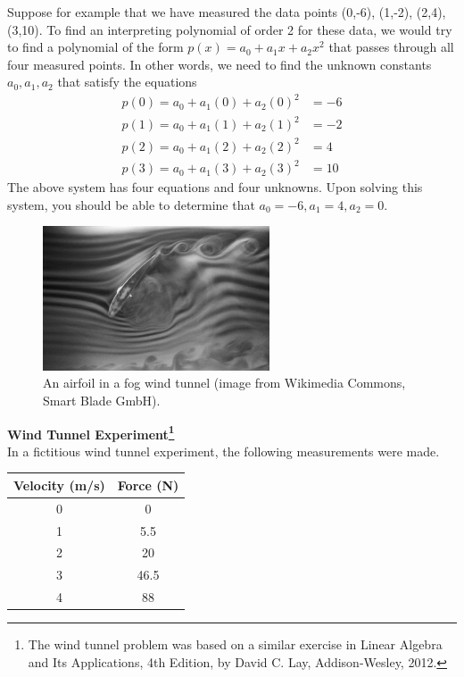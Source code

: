 Suppose for example that we have measured the data points (0,-6), (1,-2), (2,4), (3,10). To find an interpreting polynomial of order 2 for these data, we would try to find a polynomial of the form $p(x) = a_0+a_1x+a_2x^2$ that passes through all four measured points. In other words, we need to find the unknown constants $a_0, a_1, a_2$ that satisfy the equations
\begin{align*}
p(0) = a_0+a_1(0)+a_2(0)^2 &= -6 \\
p(1) = a_0+a_1(1)+a_2(1)^2 &= -2 \\
p(2) = a_0+a_1(2)+a_2(2)^2 &= 4  \\
p(3) = a_0+a_1(3)+a_2(3)^2 &= 10 
\end{align*}
The above system has four equations and four unknowns. Upon solving this system, you should be able to determine that $a_0 = -6, a_1 = 4, a_2=0$.\\

\begin{figure}[H]
  \vspace{-5pt}
  \begin{center}
    \includegraphics[width=0.6\textwidth]{ImgWindTunnel.jpg}
  \end{center}
  \vspace{-20pt}
  \caption{\small{An airfoil in a fog wind tunnel (image from Wikimedia Commons, Smart Blade GmbH).}}
\end{figure}

\textbf{Wind Tunnel Experiment\footnote{The wind tunnel problem was based on a similar exercise in Linear Algebra and Its Applications, 4th Edition, by David C. Lay, Addison-Wesley, 2012.}}\\
In a fictitious wind tunnel experiment, the following measurements were made. 
\begin{center}
  \begin{tabular}{ c c }
    Velocity (m/s) & Force (N)  \\ \hline
     0  & 0 \\
    1 & 5.5 \\
    2 & 20 \\
    3 & 46.5 \\
    4 & 88
  \end{tabular}
\end{center}

